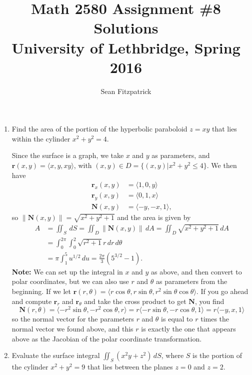 \documentclass[letterpaper,12pt]{article}
\title{Math 2580 Assignment \#8 Solutions\\University of Lethbridge, Spring 2016}
\author{Sean Fitzpatrick}
\newcommand{\len}[1]{\lVert #1\rVert}
\renewcommand{\r}{\mathbf{r}}
\newcommand{\N}{\mathbf{N}}
\begin{document}
 \maketitle


\begin{enumerate}
\item Find the area of the portion of the hyperbolic paraboloid $z=xy$ that lies within the cylinder $x^2+y^2=4$.

\bigskip

Since the surface is a graph, we take $x$ and $y$ as parameters, and $\r(x,y) = \langle x, y, xy\rangle$, with $(x,y)\in D=\{(x,y)|x^2+y^2\leq 4\}$. We then have
\begin{align*}
 \r_x(x,y) & = \langle 1, 0, y\rangle\\
 \r_y(x,y) & = \langle 0, 1, x\rangle\\
 \N(x,y) & = \langle -y, -x, 1\rangle,
\end{align*}
so $\len{\N(x,y)} = \sqrt{x^2+y^2+1}$ and the area is given by 
\begin{align*}
 A & = \iint_S \,dS = \iint_D\len{\N(x,y)}\,dA = \iint_D \sqrt{x^2+y^2+1}\,dA\\
& = \int_0^{2\pi}\int_0^2\sqrt{r^2+1}r\,dr\,d\theta\\
& = \pi \int_1^5 u^{1/2}\,du = \frac{2\pi}{3}(5^{3/2}-1).
\end{align*}
\textbf{Note:} We can set up the integral in $x$ and $y$ as above, and then convert to polar coordinates, but we can also use $r$ and $\theta$ as parameters from the beginning. If we let $\r(r,\theta) = \langle r\cos\theta, r\sin\theta, r^2\sin\theta\cos\theta\rangle$. If you go ahead and compute $\r_r$ and $\r_\theta$ and take the cross product to get $\N$, you find
\[
 \N(r,\theta) = \langle -r^2\sin\theta, -r^2\cos\theta, r\rangle = r\langle -r\sin\theta, -r\cos\theta, 1\rangle = r\langle -y,x,1\rangle
\]
so the normal vector for the parameters $r$ and $\theta$ is equal to $r$ times the normal vector we found above, and this $r$ is exactly the one that appears above as the Jacobian of the polar coordinate transformation.
\pagebreak

\item Evaluate the surface integral $\iint_S(x^2y+z^2)\,dS$, where $S$ is the portion of the cylinder $x^2+y^2=9$ that lies between the planes $z=0$ and $z=2$.

\bigskip


\end{enumerate}
\end{document}

